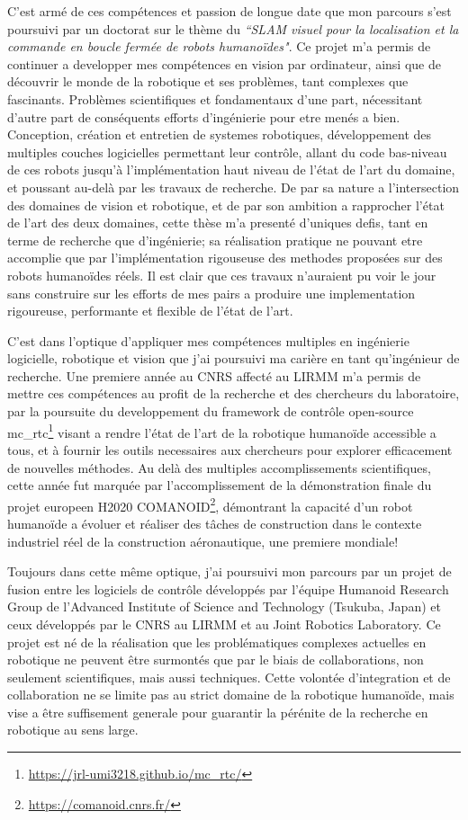 \documentclass[11pt, a4paper]{awesome-cv}
\begin{document}
\begin{cvletter}
  C'est armé de ces compétences et passion de longue date que mon parcours s'est poursuivi par un doctorat sur le thème du \emph{``SLAM visuel pour la localisation et la commande en boucle fermée de robots humanoïdes"}. Ce projet m'a permis de continuer a developper mes compétences en vision par ordinateur, ainsi que de découvrir le monde de la robotique et ses problèmes, tant complexes que fascinants. Problèmes scientifiques et fondamentaux d'une part, nécessitant d'autre part de conséquents efforts d'ingénierie pour etre menés a bien. Conception, création et entretien de systemes robotiques, développement des multiples couches logicielles permettant leur contrôle, allant du code bas-niveau de ces robots jusqu'à l'implémentation haut niveau de l'état de l'art du domaine, et poussant au-delà par les travaux de recherche. De par sa nature a l'intersection des domaines de vision et robotique, et de par son ambition a rapprocher l'état de l'art des deux domaines, cette thèse m'a presenté d'uniques defis, tant en terme de recherche que d'ingénierie; sa réalisation pratique ne pouvant etre accomplie que par l'implémentation rigouseuse des methodes proposées sur des robots humanoïdes réels. Il est clair que ces travaux n'auraient pu voir le jour sans construire sur les efforts de mes pairs a produire une implementation rigoureuse, performante et flexible de l'état de l'art.

  C'est dans l'optique d'appliquer mes compétences multiples en ingénierie logicielle, robotique et vision que j'ai poursuivi ma carière en tant qu'ingénieur de recherche. Une premiere année au CNRS affecté au LIRMM m'a permis de mettre ces compétences au profit de la recherche et des chercheurs du laboratoire, par la poursuite du developpement du framework de contrôle open-source mc\_rtc\footnote{\url{https://jrl-umi3218.github.io/mc_rtc/}} visant a rendre l'état de l'art de la robotique humanoïde accessible a tous, et à fournir les outils necessaires aux chercheurs pour explorer efficacement de nouvelles méthodes. Au delà des multiples accomplissements scientifiques, cette année fut marquée par l'accomplissement de la démonstration finale du projet europeen H2020 COMANOID\footnote{\url{https://comanoid.cnrs.fr/}}, démontrant la capacité d'un robot humanoïde a évoluer et réaliser des tâches de construction dans le contexte industriel réel de la construction aéronautique, une premiere mondiale!

  Toujours dans cette même optique, j'ai poursuivi mon parcours par un projet de fusion entre les logiciels de contrôle développés par l'équipe Humanoid Research Group de l'Advanced Institute of Science and Technology (Tsukuba, Japan) et ceux développés par le CNRS au LIRMM et au Joint Robotics Laboratory. Ce projet est né de la réalisation que les problématiques complexes actuelles en robotique ne peuvent être surmontés que par le biais de collaborations, non seulement scientifiques, mais aussi techniques. Cette volontée d'integration et de collaboration ne se limite pas au strict domaine de la robotique humanoïde, mais vise a être suffisement generale pour guarantir la pérénite de la recherche en robotique au sens large.


\end{cvletter}
\end{document}
